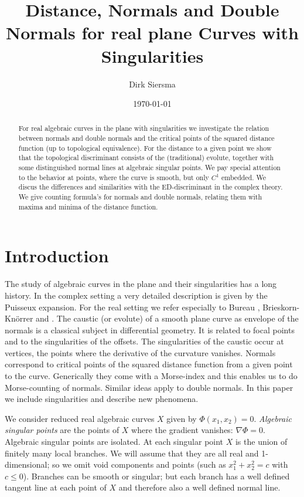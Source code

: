 \documentclass[12pt,a4,twoside]{amsart}
\title[Normals and Double Normals for plane Curves  ]{Distance, Normals and Double Normals for real  plane Curves with Singularities}
\author{Dirk Siersma}
\date{\today}
\newtheorem*{main lemma}{The main lemma}
\begin{document}
\begin{abstract}
For real algebraic curves in the plane with singularities we investigate the relation between normals and double normals and the critical points of the squared distance function (up to topological equivalence). For the distance to a given point we show that the topological discriminant consists of the (traditional) evolute, together with some distinguished normal lines at algebraic singular points. We pay special attention to the behavior at points, where the curve is smooth, but only $C^1$ embedded. We discus the differences and similarities with the ED-discriminant in the complex theory. We give counting formula's for normals and double normals, relating them with maxima and minima of the distance function.
\end{abstract}

\maketitle

\section{Introduction}




The study of algebraic curves in the plane and their singularities has a long history.  In the complex setting  a very detailed description is given by the Puisseux expansion. For the real setting we refer especially to Bureau \cite{Bu}, Brieskorn-Kn{\"o}rrer \cite{BK} and \cite{PRS}. The caustic (or evolute) of a smooth plane curve as envelope of the normals is a classical subject in differential geometry. It is related to focal points and to the singularities of the offsets. The singularities of the caustic occur at vertices,  the points where the derivative of the curvature vanishes. 
Normals correspond to critical points of the squared distance function from a given point to the curve. Generically they come with a Morse-index and this  enables us to do Morse-counting of normals. Similar ideas apply to double normals. In this paper we include singularities and describe  new phenomena.


We consider reduced real algebraic curves $X$ given by $\Phi(x_1,x_2)=0$.  \textit{Algebraic singular points} are the points of  $X$  where the gradient vanishes: $\nabla \Phi = 0$. Algebraic singular points are isolated.  
 At each singular point $X$
 is the union of finitely many local branches. We will assume that they are all real and 1-dimensional; so we omit void components  and points  (such as $x_1^2 + x_2^2 = c$ with $c \le 0$).  Branches can be smooth or singular; but each branch has a well defined tangent line at each point of $X$ and therefore also a well defined normal line.
\end{document}
